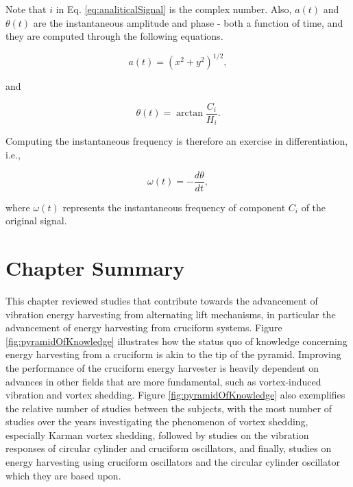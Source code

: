 \documentclass[oneside]{utmthesis}
\begin{document}
\noindent Note that $i$ in Eq. \ref{eq:analiticalSignal} is the complex number.
Also, $a(t)$ and $\theta(t)$ are the instantaneous amplitude and phase - both a function of time, and they are computed through the following equations.

\begin{equation}
  a(t) = \left( x^{2} + y^{2} \right)^{1/2},
  \label{eq:instAmplitude}
\end{equation}

\noindent and

\begin{equation}
  \theta(t) = \arctan{\frac{C_{i}}{H_{i}}}.
  \label{eq:instPhase}
\end{equation}

\noindent Computing the instantaneous frequency is therefore an exercise in differentiation, i.e.,

\begin{equation}
  \omega(t) = - \frac{d\theta}{dt},
  \label{eq:instFrequency}
\end{equation}

\noindent where $\omega(t)$ represents the instantaneous frequency of component $C_{i}$ of the original signal.


\section{Chapter Summary}
This chapter reviewed studies that contribute towards the advancement of vibration energy harvesting from alternating lift mechanisms, in particular the advancement of energy harvesting from cruciform systems. Figure \ref{fig:pyramidOfKnowledge} illustrates how the status quo of knowledge concerning energy harvesting from a cruciform is akin to the tip of the pyramid. Improving the performance of the cruciform energy harvester is heavily dependent on advances in other fields that are more fundamental, such as vortex-induced vibration and vortex shedding. Figure \ref{fig:pyramidOfKnowledge} also exemplifies the relative number of studies between the subjects, with the most number of studies over the years investigating the phenomenon of vortex shedding, especially Karman vortex shedding, followed by studies on the vibration responses of circular cylinder and cruciform oscillators, and finally, studies on energy harvesting using cruciform oscillators and the circular cylinder oscillator which they are based upon.
\end{document}
